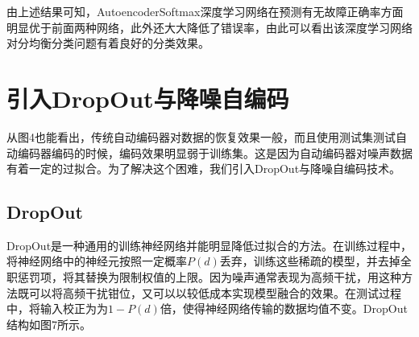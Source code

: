 \documentclass{ctacn}%
\begin{document}
\begin{multicols}{2}
由上述结果可知，AutoencoderSoftmax深度学习网络在预测有无故障正确率方面明显优于前面两种网络，此外还大大降低了错误率，由此可以看出该深度学习网络对分均衡分类问题有着良好的分类效果。

\section{引入DropOut与降噪自编码}
从图4也能看出，传统自动编码器对数据的恢复效果一般，而且使用测试集测试自动编码器编码的时候，编码效果明显弱于训练集。这是因为自动编码器对噪声数据有着一定的过拟合。为了解决这个困难，我们引入DropOut与降噪自编码技术。

\subsection{DropOut}
DropOut是一种通用的训练神经网络并能明显降低过拟合的方法。在训练过程中，将神经网络中的神经元按照一定概率$P(d)$丢弃，训练这些稀疏的模型，并去掉全职惩罚项，将其替换为限制权值的上限。因为噪声通常表现为高频干扰，用这种方法既可以将高频干扰钳位，又可以以较低成本实现模型融合的效果。在测试过程中，将输入校正为为$1-P(d)$倍，使得神经网络传输的数据均值不变。DropOut结构如图7所示。


\end{multicols}
\end{document}

